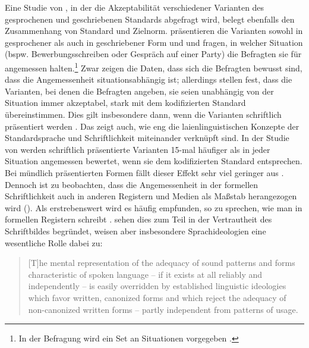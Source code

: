 Eine Studie von \citet[]{Koplenig.2016}, in der die Akzeptabilität verschiedener Varianten des gesprochenen und geschriebenen Standards abgefragt wird, belegt ebenfalls den Zusammenhang von Standard und Zielnorm.  
\citet[]{Koplenig.2016} präsentieren die Varianten sowohl in gesprochener als auch in geschriebener Form und und fragen, in welcher Situation (bspw. Bewerbungsschreiben oder Gespräch auf einer Party) die Befragten sie für angemessen halten.\footnote{In der Befragung wird ein Set an Situationen vorgegeben \citep[s.][180]{Koplenig.2016}.} 
Zwar zeigen die Daten, dass sich die Befragten bewusst sind, dass die Angemessenheit situationsabhängig ist;
allerdings stellen \citet[183]{Koplenig.2016} fest, dass die Varianten, bei denen die Befragten angeben, sie seien unabhängig von der Situation immer akzeptabel, stark mit dem kodifizierten Standard übereinstimmen.
Dies gilt insbesondere dann, wenn die Varianten schriftlich präsentiert werden \citep[s.][190]{Koplenig.2016}. 
Das zeigt auch, wie eng die laienlinguistischen Konzepte der Standardsprache und Schriftlichkeit miteinander verknüpft sind. 
In der Studie von \citet[187]{Koplenig.2016} werden schriftlich präsentierte Varianten 15-mal häufiger als in jeder Situation angemessen bewertet, wenn sie dem kodifizierten Standard entsprechen. 
Bei mündlich präsentierten Formen fällt dieser Effekt sehr viel geringer aus \citep[s.][187]{Koplenig.2016}. 
Dennoch ist zu beobachten, dass die Angemessenheit in der formellen Schriftlichkeit auch in anderen Registern und Medien als Maßstab herangezogen wird (\cites[s.][32]{Schneider2013}[190]{Koplenig.2016}). 
Als erstrebenswert wird es häufig empfunden, so zu sprechen, wie man in formellen Registern schreibt \citep[s.][172]{Beuge2017}. 
\citet[190]{Koplenig.2016} sehen dies zum Teil in der Vertrautheit des Schriftbildes begründet, weisen aber insbesondere Sprachideologien eine wesentliche Rolle dabei zu:  
\begin{quote}[T]he mental representation of the adequacy of sound patterns and forms characteristic of spoken language -- if it exists at all reliably and independently -- is easily overridden by established linguistic ideologies which favor written, canonized forms and which reject the adequacy of non-canonized written forms -- partly independent from patterns of usage. \citep[192]{Koplenig.2016}\end{quote}
